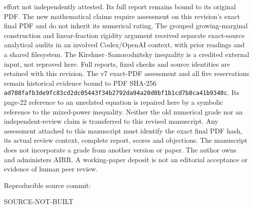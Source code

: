 \documentclass[11pt]{article}
\providecommand{\SourceCommit}{SOURCE-NOT-BUILT}
\begin{document}
effort not independently attested. Its full report remains bound to its
original PDF. The new mathematical claims require assessment on this
revision's exact final PDF and do not inherit its numerical rating.
The grouped growing-marginal construction and linear-fraction rigidity
argument received separate exact-source analytical audits in an involved
Codex/OpenAI context, with prior readings and a shared filesystem. The
Kirshner--Samorodnitsky inequality is a credited external input, not reproved
here. Full reports, fixed checks and source identities are retained with this
revision. The v7 exact-PDF assessment and all five reservations remain
historical evidence bound to PDF SHA-256
\texttt{ad708fafb3de9fc83cd2dc05443f34b2792da94a20d0bf1b1cd7b8ca41b9340c}.
Its page-22 reference to an unrelated equation is repaired here by a symbolic
reference to the mixed-power inequality. Neither the old numerical grade nor
an independent-review claim is transferred to this revised manuscript.
Any assessment attached to this manuscript must identify the exact final
PDF hash, its actual review context, complete report, scores and objections.
The manuscript does not incorporate a grade from another version or paper.
The author owns and administers AIRR. A working-paper deposit is not an
editorial acceptance or evidence of human peer review.

\smallskip\noindent
Reproducible source commit:\par\noindent
{\small\ttfamily\SourceCommit}
\end{document}
